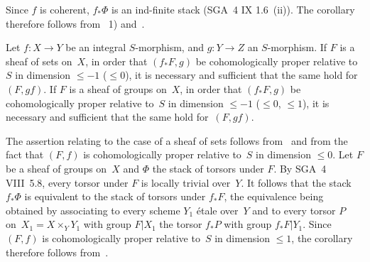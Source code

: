 Since $f$ is coherent, $f_* \Phi$ is an ind-finite stack (SGA~4 IX
1.6~(ii)). The corollary therefore follows from ~1)
and~.

\begin{corollary}
\label{XIII.1.9}
Let $f \colon X \to Y$ be an integral $S$-morphism, and $g \colon Y \to Z$
an $S$-morphism. If $F$ is a sheaf of sets on~$X$, in order that
$(f_* F, g)$ be cohomologically proper relative to~$S$
in dimension $\leqslant -1$ (\resp $\leqslant 0$), it is necessary and
sufficient that the same hold for~$(F, gf)$. If $F$ is a sheaf of
groups on~$X$, in order that $(f_* F, g)$ be cohomologically
proper relative to~$S$ in dimension $\leqslant -1$
(\resp $\leqslant 0$, \resp $\leqslant 1$), it is necessary and sufficient that
the same hold for~$(F, gf)$.
\end{corollary}

The assertion
relating to the case of a sheaf of sets follows
from~ and from the fact that $(F,f)$ is cohomologically proper
relative to~$S$ in dimension $\leqslant 0$. Let $F$ be a
sheaf of groups on~$X$ and $\Phi$ the stack of torsors under $F$.
By SGA~4 VIII~5.8, every torsor under $F$ is locally
trivial over~$Y$. It follows that the stack $f_* \Phi$ is
equivalent to the stack of torsors under $f_* F$, the equivalence
being obtained by associating to every scheme $Y_1$ \'etale
over~$Y$ and to every torsor $P$ on~$X_1 = X \times_Y Y_1$ with group
$F|X_1$ the torsor $f_* P$ with group $f_* F | Y_1$. Since $(F,f)$ is
cohomologically proper relative to~$S$ in dimension
$\leqslant 1$, the corollary therefore follows from~.
